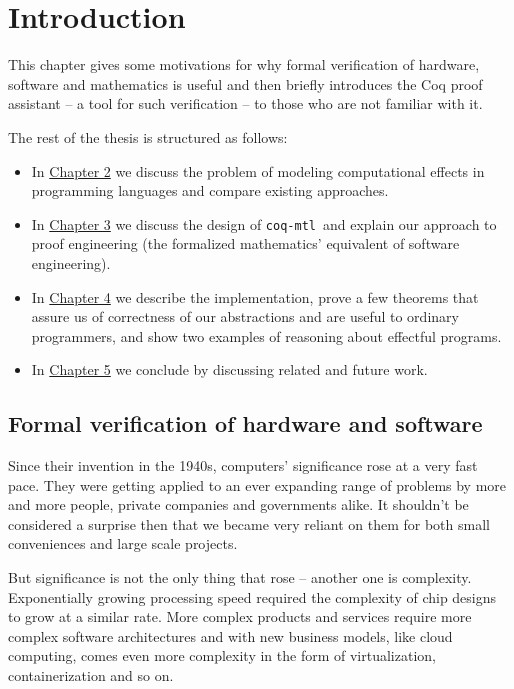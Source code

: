 \documentclass[declaration,inz,english,shortabstract]{iithesis}
\author         {Wojciech Kołowski}
\date           {10 września 2019}                     %
\newcommand{\libname}{\m{coq-mtl}}
\newcommand{\m}[1]{\texttt{#1}}
\begin{document}

\chapter{Introduction} \label{ch1}

This chapter gives some motivations for why formal verification of hardware, software and mathematics is useful and then briefly introduces the Coq proof assistant -- a tool for such verification -- to those who are not familiar with it.

The rest of the thesis is structured as follows:

\begin{itemize}
    \item In \hyperref[ch2]{Chapter 2} we discuss the problem of modeling computational effects in programming languages and compare existing approaches.
    \item In \hyperref[ch3]{Chapter 3} we discuss the design of \libname\ and explain our approach to proof engineering (the formalized mathematics' equivalent of software engineering).
    \item In \hyperref[ch4]{Chapter 4} we describe the implementation, prove a few theorems that assure us of correctness of our abstractions and are useful to ordinary programmers, and show two examples of reasoning about effectful programs.
    \item In \hyperref[ch5]{Chapter 5} we conclude by discussing related and future work.
\end{itemize}

\section{Formal verification of hardware and software}

Since their invention in the 1940s, computers' significance rose at a very fast pace. They were getting applied to an ever expanding range of problems by more and more people, private companies and governments alike. It shouldn't be considered a surprise then that we became very reliant on them for both small conveniences and large scale projects.

But significance is not the only thing that rose -- another one is complexity. Exponentially growing processing speed required the complexity of chip designs to grow at a similar rate. More complex products and services require more complex software architectures and with new business models, like cloud computing, comes even more complexity in the form of virtualization, containerization and so on.
\end{document}
